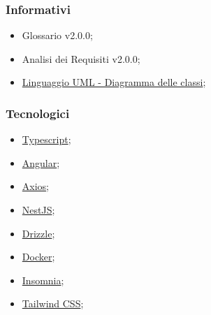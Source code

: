 \subsubsection{Informativi}
\begin{itemize}
	\item Glossario v2.0.0;
	\item Analisi dei Requisiti v2.0.0;
	\item \href{https://www.math.unipd.it/~rcardin/swea/2023/Diagrammi\%20delle\%20Classi.pdf}
	      {Linguaggio UML - Diagramma delle classi};
\end{itemize}

\subsubsection{Tecnologici}
\begin{itemize}
	\item \href{https://www.typescriptlang.org/}
	      {Typescript};

	\item \href{https://angular.io/}
	      {Angular};

	\item \href{https://axios-http.com/}
	      {Axios};

	\item \href{https://nestjs.com/}
	      {NestJS};

	\item \href{https://orm.drizzle.team/}
	      {Drizzle};

	\item \href{https://www.docker.com/}
	      {Docker};

	\item \href{https://insomnia.rest/}
	      {Insomnia};

	\item \href{https://tailwindcss.com/}
	      {Tailwind CSS};
\end{itemize}

